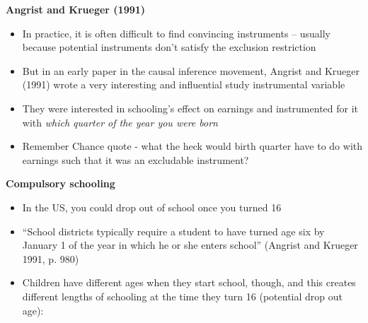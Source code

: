 \documentclass[notes=show]{beamer}
\begin{document}
\begin{frame}[plain]

	\begin{center}
	\textbf{Angrist and Krueger (1991)}
	\end{center}
	
	\begin{itemize}
	\item In practice, it is often difficult to find convincing instruments -- usually because potential instruments don't satisfy the exclusion restriction
	\item But in an early paper in the causal inference movement, Angrist and Krueger (1991) wrote a very interesting and influential study instrumental variable 
	\item They were interested in schooling's effect on earnings and instrumented for it with \emph{which quarter of the year you were born}
	\item Remember Chance quote - what the heck would birth quarter have to do with earnings such that it was an excludable instrument?
	\end{itemize}
	
\end{frame}


\begin{frame}[plain]
\begin{center}
\textbf{Compulsory schooling}
\end{center}

\begin{itemize}

	\item In the US, you could drop out of school once you turned 16
	\item ``School districts typically require a student to have turned age six by January 1 of the year in which he or she enters school'' (Angrist and Krueger 1991, p. 980)
	\item Children have different ages when they start school, though, and this creates different lengths of schooling at the time they turn 16 (potential drop out age):
	\end{itemize}
	
\end{frame}
\end{document}
